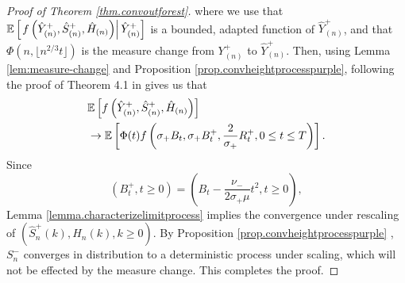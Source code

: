 \begin{proof}[Proof of Theorem \ref{thm.convoutforest}]
where we use that ${\mathbb E}\left[\left. f\left(\hat{Y}^+_{(n)},\hat{S}^+_{(n)},  \hat{H}_{(n)}\right)\right|\hat{Y}^+_{(n)}\right]$ is a bounded, adapted function of $\hat{Y}^+_{(n)}$, and that $\Phi(n,\lfloor n^{2/3} t\rfloor)$ is the measure change from ${Y}^+_{(n)}$ to $\hat{Y}^+_{(n)}$. Then, using Lemma \ref{lem:measure-change} and Proposition \ref{prop.convheightprocesspurple}, following the proof of Theorem 4.1 in \cite{conchon--kerjanStableGraphMetric2020} gives us that 
\begin{align*}
    &{\mathbb E}\left[f\left(\hat{Y}^+_{(n)},\hat{S}^+_{(n)},  \hat{H}_{(n)}\right) \right]\\
    &\to {\mathbb E}\left[\Phi(t)f\left(\sigma_+ B_t,\sigma_+ B^+_t,\frac{2}{\sigma_+}R^+_t,0\leq t \leq T\right)\right].
\end{align*}
Since $$(B^+_t,t\geq 0)=\left(B_t-\frac{\nu_-}{2\sigma_+ \mu}t^2,t\geq 0\right),$$
Lemma \ref{lemma.characterizelimitprocess} implies the convergence under rescaling of $(\hat{S}^+_n(k),\hat{H}_n(k),k\geq 0)$. By Proposition \ref{prop.convheightprocesspurple} , $S^{-}_n$ converges in distribution to a deterministic process under scaling, which will not be effected by the measure change. This completes the proof. 
\end{proof}

